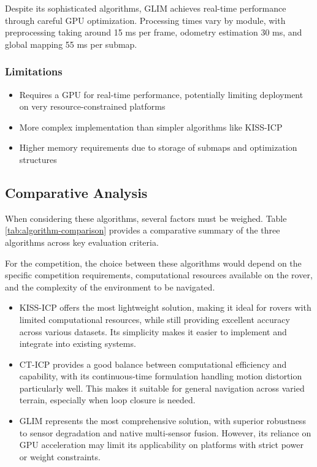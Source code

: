 \documentclass[journal]{IEEEtran}
\begin{document}
\newpage
Despite its sophisticated algorithms, GLIM achieves real-time performance through careful GPU optimization. Processing times vary by module, with preprocessing taking around 15 ms per frame, odometry estimation 30 ms, and global mapping 55 ms per submap.

\subsubsection{Limitations}

\begin{itemize}
    \item Requires a GPU for real-time performance, potentially limiting deployment on very resource-constrained platforms
    \item More complex implementation than simpler algorithms like KISS-ICP
    \item Higher memory requirements due to storage of submaps and optimization structures
\end{itemize}

\subsection{Comparative Analysis}

When considering these algorithms, several factors must be weighed. Table \ref{tab:algorithm-comparison} provides a comparative summary of the three algorithms across key evaluation criteria.

For the competition, the choice between these algorithms would depend on the specific competition requirements, computational resources available on the rover, and the complexity of the environment to be navigated. 

\begin{itemize}
    \item KISS-ICP offers the most lightweight solution, making it ideal for rovers with limited computational resources, while still providing excellent accuracy across various datasets. Its simplicity makes it easier to implement and integrate into existing systems.

    \item CT-ICP provides a good balance between computational efficiency and capability, with its continuous-time formulation handling motion distortion particularly well. This makes it suitable for general navigation across varied terrain, especially when loop closure is needed.
    
    \item GLIM represents the most comprehensive solution, with superior robustness to sensor degradation and native multi-sensor fusion. However, its reliance on GPU acceleration may limit its applicability on platforms with strict power or weight constraints.
    
\end{itemize}
\end{document}
